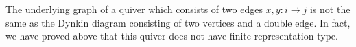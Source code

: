 The underlying graph of a quiver which consists of two edges
$x, y\colon i\to j$ is not the same as the Dynkin diagram consisting of two
vertices and a double edge.
In fact, we have proved above that this quiver does not have
finite representation type.
